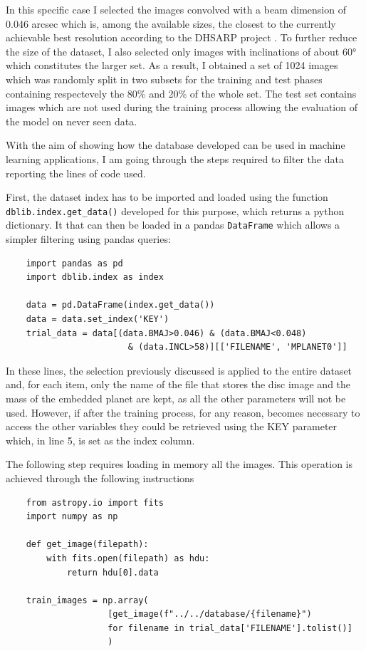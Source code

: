 \documentclass[a4paper,10pt]{report}
\begin{document}
In this specific case I selected the images convolved with a beam dimension of 0.046 arcsec which is,
among the available sizes, the closest to the currently achievable best resolution according to the DHSARP project \cite{dsharp}.
To further reduce the size of the dataset, I also selected only images with inclinations of about
60° which constitutes the larger set.
As a result, I obtained a set of 1024 images which was randomly split in two subsets for the training and
test phases containing respectevely the 80\% and 20\% of the whole set.
The test set contains images which are not used during the training process allowing the evaluation
of the model on never seen data.

With the aim of showing how the database developed can be used in machine learning applications,
I am going through the steps required to filter the data reporting the lines of code used.

First, the dataset index has to be imported and loaded using 
the function \lstinline{dblib.index.get_data()} 
developed for this purpose, which returns
a python dictionary. It that can then be loaded in a pandas \lstinline{DataFrame}
which allows a simpler filtering using pandas queries:

\begin{lstlisting}
    import pandas as pd
    import dblib.index as index

    data = pd.DataFrame(index.get_data())
    data = data.set_index('KEY')
    trial_data = data[(data.BMAJ>0.046) & (data.BMAJ<0.048)
                        & (data.INCL>58)][['FILENAME', 'MPLANET0']]
\end{lstlisting}

In these lines, the selection previously discussed is applied to the entire dataset and,
for each item, only the name of the file that stores the disc image and the mass of the embedded planet are kept, as
all the other parameters will not be used. However, if after the training process, for any reason, becomes necessary
to access the other variables they could be retrieved using the KEY parameter which, in line 5, is set as 
the index column.

The following step requires loading in memory all the images. This operation is achieved through the following
instructions

\begin{lstlisting}
    from astropy.io import fits
    import numpy as np

    def get_image(filepath):
        with fits.open(filepath) as hdu:
            return hdu[0].data
    
    train_images = np.array(
                    [get_image(f"../../database/{filename}") 
                    for filename in trial_data['FILENAME'].tolist()]
                    )
\end{lstlisting}
\end{document}
